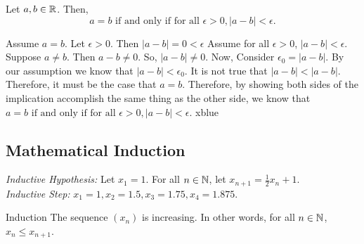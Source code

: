 \setcounter{BoxCounter}{5}
\begin{theorem}
    Let \(a,b \in \mathbb{R}\). Then, \[a = b \text{ if and only if for all } \epsilon > 0, |a-b| < \epsilon.\]
\end{theorem}

\iffpf
{Assume \(a = b\). Let \(\epsilon > 0\). Then \(|a-b| = 0 < \epsilon\)}
{Assume for all \(\epsilon > 0\), \(|a-b| < \epsilon\). Suppose \(a \ne b\). Then \(a - b \ne 0\). So, \(|a-b| \ne 0\). Now, Consider \(\epsilon_0 = |a-b|\). By our assumption we know that \(|a-b| < \epsilon_0\). It is not true that \(|a-b| < |a - b|\). Therefore, it must be the case that \(a = b\).}
{Therefore, by showing both sides of the implication accomplish the same thing as the other side, we know that \(a = b \text{ if and only if for all } \epsilon > 0, |a-b| < \epsilon.\)}
{xblue}

\subsection{Mathematical Induction} \hfill

\textit{Inductive Hypothesis:} Let \(x_1 = 1\). For all \(n \in \mathbb{N}\), let \(x_{n+1} = \frac{1}{2}x_n + 1\). \\

\textit{Inductive Step:} \(x_1 = 1, x_2 = 1.5, x_3 = 1.75, x_4 = 1.875\). \\

\begin{example}
    {Induction} The sequence \((x_n)\) is increasing. In other words, for all \(n\in \mathbb{N}\), \(x_n \leq x_{n+1}\).
\end{example}



